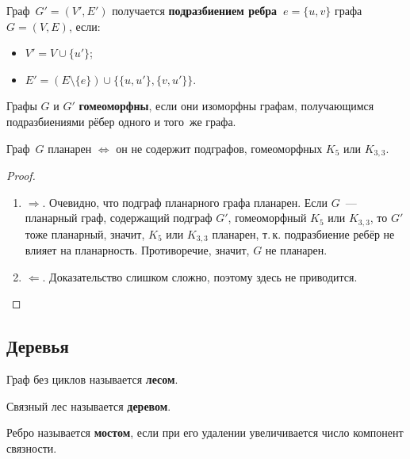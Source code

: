 Граф~$G' = (V', E')$ получается \textbf{подразбиением ребра~$e = \{ u, v \}$} графа~$G = (V, E)$, если:
\begin{itemize}
	\item $V' = V \cup \{ u' \}$;
	\item $E' = (E \setminus \{ e \}) \cup \{ \{ u, u' \}, \{ v, u' \} \}$.
\end{itemize}

 Графы $G$ и $G'$ \textbf{гомеоморфны}, если они изоморфны графам, получающимся подразбиениями рёбер одного и того~же графа.

\begin{theorem}
Граф~$G$ планарен $\Leftrightarrow$ он не содержит подграфов, гомеоморфных $K_5$ или $K_{3,3}$.
\end{theorem}
\begin{proof}
\begin{enumerate}
	\item $\Rightarrow$. Очевидно, что подграф планарного графа планарен.
	Если $G$~--- планарный граф, содержащий подграф $G'$, гомеоморфный $K_5$ или $K_{3,3}$, то $G'$ тоже планарный, значит, $K_5$ или $K_{3,3}$ планарен, т.\,к. подразбиение ребёр не влияет на планарность.
	Противоречие, значит, $G$ не планарен.
	\item $\Leftarrow$. Доказательство слишком сложно, поэтому здесь не приводится.
\end{enumerate}
\end{proof}

\subsection{Деревья}
 Граф без циклов называется \textbf{лесом}.

 Связный лес называется \textbf{деревом}.

 Ребро называется \textbf{мостом}, если при его удалении увеличивается число компонент связности.

